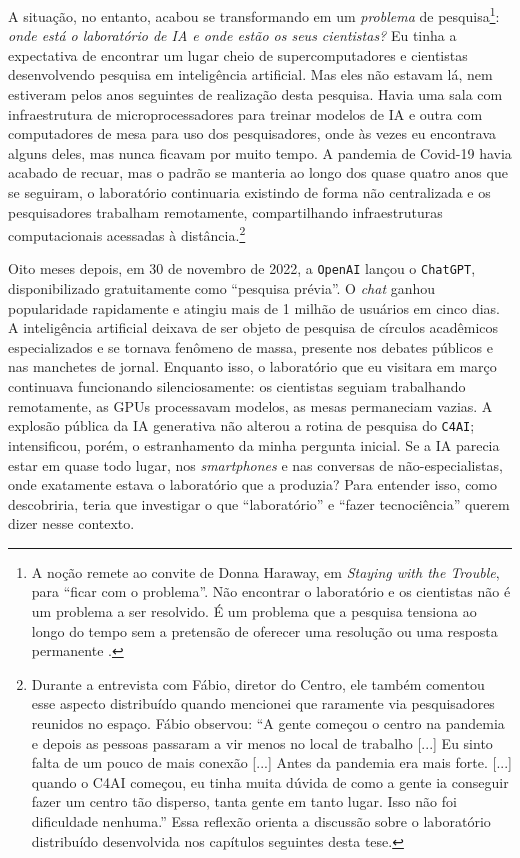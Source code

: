 A situação, no entanto, acabou se transformando em um \textit{problema} de pesquisa\footnote{A noção remete ao convite de Donna Haraway, em \textit{Staying with the Trouble}, para \enquote{ficar com o problema}. Não encontrar o laboratório e os cientistas não é um problema a ser resolvido. É um problema que a pesquisa tensiona ao longo do tempo sem a pretensão de oferecer uma resolução ou uma resposta permanente \parencite{Haraway2016Staying}.}: \textit{onde está o laboratório de IA e onde estão os seus cientistas?} Eu tinha a expectativa de encontrar um lugar cheio de supercomputadores e cientistas desenvolvendo pesquisa em inteligência artificial. Mas eles não estavam lá, nem estiveram pelos anos seguintes de realização desta pesquisa. Havia uma sala com infraestrutura de microprocessadores para treinar modelos de IA e outra com computadores de mesa para uso dos pesquisadores, onde às vezes eu encontrava alguns deles, mas nunca ficavam por muito tempo. A pandemia de Covid-19 havia acabado de recuar, mas o padrão se manteria ao longo dos quase quatro anos que se seguiram, o laboratório continuaria existindo de forma não centralizada e os pesquisadores trabalham remotamente, compartilhando infraestruturas computacionais acessadas à distância.\footnote{Durante a entrevista com Fábio, diretor do Centro, ele também comentou esse aspecto distribuído quando mencionei que raramente via pesquisadores reunidos no espaço. Fábio observou: \enquote{A gente começou o centro na pandemia e depois as pessoas passaram a vir menos no local de trabalho [...] Eu sinto falta de um pouco de mais conexão [...] Antes da pandemia era mais forte. [...] quando o C4AI começou, eu tinha muita dúvida de como a gente ia conseguir fazer um centro tão disperso, tanta gente em tanto lugar. Isso não foi dificuldade nenhuma.} Essa reflexão orienta a discussão sobre o laboratório distribuído desenvolvida nos capítulos seguintes desta tese.}

Oito meses depois, em 30 de novembro de 2022, a \texttt{OpenAI} lançou o \texttt{ChatGPT}, disponibilizado gratuitamente como \enquote{pesquisa prévia}. O \textit{chat} ganhou popularidade rapidamente e atingiu mais de 1 milhão de usuários em cinco dias. A inteligência artificial deixava de ser objeto de pesquisa de círculos acadêmicos especializados e se tornava fenômeno de massa, presente nos debates públicos e nas manchetes de jornal. Enquanto isso, o laboratório que eu visitara em março continuava funcionando silenciosamente: os cientistas seguiam trabalhando remotamente, as GPUs processavam modelos, as mesas permaneciam vazias. A explosão pública da IA generativa não alterou a rotina de pesquisa do \texttt{C4AI}; intensificou, porém, o estranhamento da minha pergunta inicial. Se a IA parecia estar em quase todo lugar, nos \textit{smartphones} e nas conversas de não-especialistas, onde exatamente estava o laboratório que a produzia? Para entender isso, como descobriria, teria que investigar o que \enquote{laboratório} e \enquote{fazer tecnociência} querem dizer nesse contexto. 

